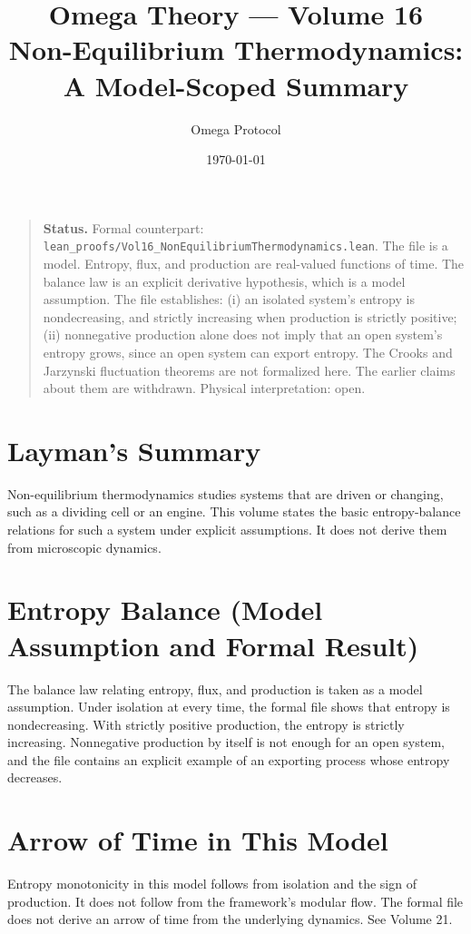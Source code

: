 \documentclass[11pt, a4paper]{article}
\title{Omega Theory --- Volume 16\\\Large Non-Equilibrium Thermodynamics: A Model-Scoped Summary}
\author{Omega Protocol}
\date{\today}
\begin{document}
\maketitle

\begin{quote}
\textbf{Status.} Formal counterpart: \texttt{lean\_proofs/Vol16\_NonEquilibriumThermodynamics.lean}. The file is a model. Entropy, flux, and production are real-valued functions of time. The balance law is an explicit derivative hypothesis, which is a model assumption. The file establishes: (i) an isolated system's entropy is nondecreasing, and strictly increasing when production is strictly positive; (ii) nonnegative production alone does not imply that an open system's entropy grows, since an open system can export entropy. The Crooks and Jarzynski fluctuation theorems are not formalized here. The earlier claims about them are withdrawn. Physical interpretation: open.
\end{quote}

\section*{Layman's Summary}
Non-equilibrium thermodynamics studies systems that are driven or changing, such as a dividing cell or an engine. This volume states the basic entropy-balance relations for such a system under explicit assumptions. It does not derive them from microscopic dynamics.

\section{Entropy Balance (Model Assumption and Formal Result)}
The balance law relating entropy, flux, and production is taken as a model assumption. Under isolation at every time, the formal file shows that entropy is nondecreasing. With strictly positive production, the entropy is strictly increasing. Nonnegative production by itself is not enough for an open system, and the file contains an explicit example of an exporting process whose entropy decreases.

\section{Arrow of Time in This Model}
Entropy monotonicity in this model follows from isolation and the sign of production. It does not follow from the framework's modular flow. The formal file does not derive an arrow of time from the underlying dynamics. See Volume 21.
\end{document}

